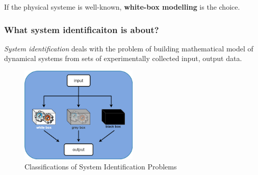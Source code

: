 If the physical systeme is well-known, \textbf{white-box modelling} is the choice.

\subsubsection{What system identificaiton is about?}
\textit{System identification} deals with the problem of building mathematical model of dynamical systems from sets of experimentally collected input, output data.


\begin{figure}[htbp]
    \centering
    \includegraphics[width=0.5\textwidth]{images/system-id-scheme.png}
    \caption{Classifications of System Identification Problems}
    \label{fig:id_classes}
\end{figure}

